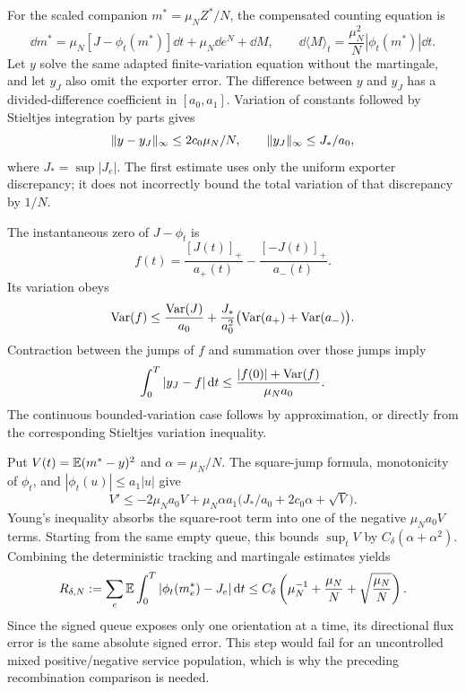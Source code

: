 For the scaled companion $m^*=\mu_NZ^*/N$, the compensated counting equation is
\[
\dd m^*=\mu_N[J-\phi_t(m^*)]\dd t+\mu_N\dd e^N+\dd M,
\qquad
\dd\langle M\rangle_t=\frac{\mu_N^2}{N}|\phi_t(m^*)|\dd t.
\]
Let $y$ solve the same adapted finite-variation equation without the martingale, and let $y_J$ also omit the exporter error. The difference between $y$ and $y_J$ has a divided-difference coefficient in $[a_0,a_1]$. Variation of constants followed by Stieltjes integration by parts gives
\[
\lVert y-y_J\rVert_\infty\le2c_0\mu_N/N,
\qquad
\lVert y_J\rVert_\infty\le J_*/a_0,
\]
where $J_*=\sup|J_e|$. The first estimate uses only the uniform exporter discrepancy; it does not incorrectly bound the total variation of that discrepancy by $1/N$.

The instantaneous zero of $J-\phi_t$ is
\[
f(t)=\frac{[J(t)]_+}{a_+(t)}-\frac{[-J(t)]_+}{a_-(t)}.
\]
Its variation obeys
\[
\operatorname{Var}(f)\le\frac{\operatorname{Var}(J)}{a_0}
 +\frac{J_*}{a_0^2}\bigl(\operatorname{Var}(a_+)+\operatorname{Var}(a_-)\bigr).
\]
Contraction between the jumps of $f$ and summation over those jumps imply
\[
\int_0^T|y_J-f|\,\mathrm d t
\le\frac{|f(0)|+\operatorname{Var}(f)}{\mu_Na_0}.
\]
The continuous bounded-variation case follows by approximation, or directly from the corresponding Stieltjes variation inequality.

Put $V(t)=\mathbb E(m^*-y)^2$ and $\alpha=\mu_N/N$. The square-jump formula, monotonicity of $\phi_t$, and $|\phi_t(u)|\le a_1|u|$ give
\[
V'\le-2\mu_Na_0V+
\mu_N\alpha a_1\bigl(J_*/a_0+2c_0\alpha+\sqrt V\bigr).
\]
Young's inequality absorbs the square-root term into one of the negative $\mu_Na_0V$ terms. Starting from the same empty queue, this bounds $\sup_t V$ by $C_\delta(\alpha+\alpha^2)$. Combining the deterministic tracking and martingale estimates yields
\begin{equation}\label{eq:appR}
R_{\delta,N}:=\sum_e\mathbb E\int_0^T|\phi_t(m_e^*)-J_e|\,\mathrm d t
\le C_\delta\left(\mu_N^{-1}+\frac{\mu_N}{N}
 +\sqrt{\frac{\mu_N}{N}}\right).
\end{equation}
Since the signed queue exposes only one orientation at a time, its directional flux error is the same absolute signed error. This step would fail for an uncontrolled mixed positive/negative service population, which is why the preceding recombination comparison is needed.

